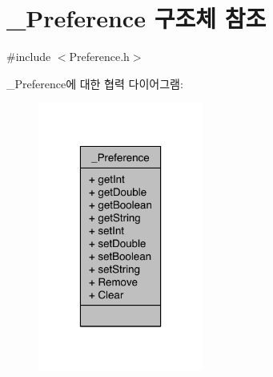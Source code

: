 \hypertarget{struct___preference}{\section{\-\_\-\-Preference 구조체 참조}
\label{struct___preference}
}


{\ttfamily \#include $<$Preference.\-h$>$}



\-\_\-\-Preference에 대한 협력 다이어그램\-:\nopagebreak
\begin{figure}[H]
\begin{center}
\leavevmode
\includegraphics[width=154pt]{db/dfb/struct___preference__coll__graph}
\end{center}
\end{figure}
